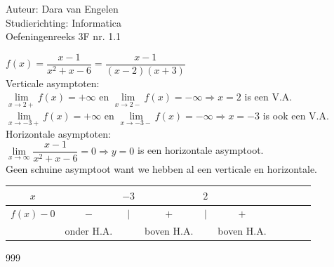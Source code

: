 \documentclass[a4paper]{article}
\begin{document}
  
\noindent \large Auteur: Dara van Engelen \\
\noindent \large Studierichting: Informatica\\
\noindent \large Oefeningenreeks 3F nr. 1.1\\

\medskip

\normalsize

$f(x)=\dfrac{x-1}{x^2+x-6}=\dfrac{x-1}{(x-2)(x+3)}$\\

Verticale asymptoten:\\

$\lim\limits_{x \rightarrow 2+}f(x)=+\infty$ en $\lim\limits_{x \rightarrow 2-}f(x)=-\infty\Rightarrow x = 2$ is een V.A.\\

$\lim\limits_{x \rightarrow -3+}f(x)=+\infty $ en $\lim\limits_{x \rightarrow -3-}f(x)=-\infty \Rightarrow x= -3$ is ook een V.A.\\

Horizontale asymptoten:\\

$\lim\limits_{x \rightarrow \infty}\dfrac{x-1}{x^2+x-6}=0\Rightarrow y = 0$ is een horizontale asymptoot.\\

Geen schuine asymptoot want we hebben al een verticale en horizontale.\\

\begin{tabular}{c|ccccccccc}
$x$			& & $-3$ & & $2$ &\\ \hline
$f(x)-0$ 		& $-$ &   $|$   & $+$ & $|$ & $+$\\ 
			& onder H.A. & & boven H.A. & & boven H.A.\\
\end{tabular}

\begin{thebibliography}{999}
\end{thebibliography}
\end{document}
